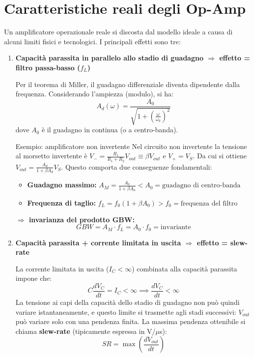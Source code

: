\section{Caratteristiche reali degli Op-Amp}

Un amplificatore operazionale reale si discosta dal modello ideale a causa di alcuni limiti fisici e tecnologici. I principali effetti sono tre:

\begin{enumerate}[label=\textbf{\arabic*.}, leftmargin=*, itemsep=0.4cm, topsep=0.3cm]

    \item \textbf{Capacità parassita in parallelo allo stadio di guadagno $\Rightarrow$ effetto = filtro passa-basso ($f_L$)}

    Per il teorema di Miller, il guadagno differenziale diventa dipendente dalla frequenza. Considerando l'ampiezza (modulo), si ha:
    \[ A_d(\omega) = \frac{A_0}{\sqrt{1 + \left(\frac{\omega}{\omega_0}\right)^2}} \]
    dove $A_0$ è il guadagno in continua (o a centro-banda).

    \begin{osservazione}{Esempio: amplificatore non invertente}
        Nel circuito non invertente la tensione al morsetto invertente è $V_- = \frac{R_1}{R_1 + R_2} V_{out} \equiv \beta V_{out}$ e $V_+ = V_S$.
        Da cui si ottiene $V_{out} = \frac{A_d}{1 + \beta A_d} V_S$. Questo comporta due conseguenze fondamentali:
        \begin{itemize}[label=$\Rightarrow$, leftmargin=*, noitemsep, topsep=0.1cm, parsep=0pt]
            \item \textbf{Guadagno massimo:} $A_M = \frac{A_0}{1 + \beta A_0} < A_0 = \text{guadagno di centro-banda}$
            \item \textbf{Frequenza di taglio:} $f_L = f_0 (1 + \beta A_0) > f_0 = \text{frequenza del filtro}$
        \end{itemize}
        \vspace{0.2cm}
        \textcolor{noteteal}{\textbf{$\Rightarrow$ invarianza del prodotto GBW:}} 
        \[ GBW = A_M \cdot f_L = A_0 \cdot f_0 = \text{invariante} \]
    \end{osservazione}

    \item \textbf{Capacità parassita + corrente limitata in uscita $\Rightarrow$ effetto = slew-rate}

    La corrente limitata in uscita ($I_C < \infty$) combinata alla capacità parassita impone che:
    \[ C \frac{d V_C}{dt} = I_C < \infty \implies \frac{d V_C}{dt} < \infty \]
    La tensione ai capi della capacità dello stadio di guadagno non può quindi variare istantaneamente, e questo limite si trasmette agli stadi successivi: $V_{out}$ può variare solo con una pendenza finita. La massima pendenza ottenibile si chiama \textbf{slew-rate} (tipicamente espressa in V/$\mu$s):
    \[ SR = \max \left( \frac{d V_{out}}{dt} \right) \]


\end{enumerate}
